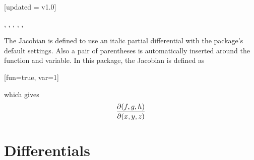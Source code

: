	\begin{function}{\jdv}[updated = v1.0]
		\begin{syntax}
			\sarg, , , \targ{/}, , 
		\end{syntax}
		The Jacobian is defined to use an italic partial differential with the package's default settings. Also a pair of parentheses is automatically inserted around the function and variable. In this package, the Jacobian is defined as
		
		\begin{definition}
			\DeclareDerivative{\jdv}{\partial}[fun=true, var=1]
		\end{definition}
		
		\noindent which gives
		\begin{equation*}
			\jdv{f,g,h}{x,y,z}
		\end{equation*}
	\end{function}
	
	
	
	\clearpage
	\section{Differentials}
	
